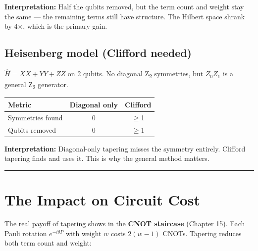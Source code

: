 \documentclass[
  11pt,
  oneside]{book}
\begin{document}
\textbf{Interpretation:} Half the qubits removed, but the term count and
weight stay the same --- the remaining terms still have structure. The
Hilbert space shrank by 4$\times$, which is the primary gain.

\subsection{Heisenberg model (Clifford
needed)}\label{heisenberg-model-clifford-needed}

\(\hat{H} = XX + YY + ZZ\) on 2 qubits. No diagonal Z\textsubscript{2} symmetries, but
\(Z_0Z_1\) is a general Z\textsubscript{2} generator.

\begin{longtable}[]{@{}lcc@{}}
\toprule\noalign{}
Metric & Diagonal only & Clifford \\
\midrule\noalign{}
\endhead
\bottomrule\noalign{}
\endlastfoot
Symmetries found & 0 & $\geq$1 \\
Qubits removed & 0 & $\geq$1 \\
\end{longtable}

\textbf{Interpretation:} Diagonal-only tapering misses the symmetry
entirely. Clifford tapering finds and uses it. This is why the general
method matters.

\begin{center}\rule{0.5\linewidth}{0.5pt}\end{center}

\section{The Impact on Circuit Cost}\label{the-impact-on-circuit-cost}

The real payoff of tapering shows in the \textbf{CNOT staircase}
(Chapter 15). Each Pauli rotation \(e^{-i\theta P}\) with weight \(w\)
costs \(2(w-1)\) CNOTs. Tapering reduces both term count and weight:
\end{document}
